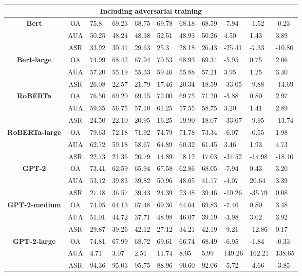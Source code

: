 \documentclass{article}
\begin{document}
\begin{table}[ht]
\begin{tabular}{c|c|p{0.6cm}p{0.6cm}p{0.6cm}|p{1cm}p{1cm}p{1cm}|p{1cm}p{1cm}p{1cm}}
\multicolumn{11}{c}{\textbf{Including adversarial training}} \\ \hline
\multirow{3}{*}{\textbf{Bert}} & OA   & 75.8  & 69.23 & 68.75 & 69.78 & 68.18 & 68.59 & -7.94 & -1.52 & -0.23 \\ 
& AUA  & 50.25 & 48.24 & 48.38 & 52.51 & 48.93 & 50.26 & 4.50 & 1.43 & 3.89  \\ 
& ASR  & 33.92 & 30.41 & 29.63 & 25.3  & 28.18 & 26.43 & -25.41 & -7.33 & -10.80 \\ \hline
\multirow{3}{*}{\textbf{Bert-large}} & OA   & 74.99  & 68.42 & 67.94 & 70.53 & 68.93 & 69.34 & -5.95 & 0.75 & 2.06 \\ 
& AUA  & 57.20  & 55.19  & 55.33  & 59.46 & 55.88 & 57.21  & 3.95 & 1.25 & 3.40 \\ 
& ASR  & 26.08 & 22.57 & 21.79 & 17.46 & 20.34 & 18.59 & -33.05 & -9.88 & -14.69 \\ \hline
\multirow{3}{*}{\textbf{RoBERTa}} & OA & 76.50 & 69.20 & 69.15 & 72.00 & 69.75 & 71.20 & -5.88 & 0.80 & 2.97 \\ 
& AUA & 59.35 & 56.75 & 57.10 & 61.25 & 57.55 & 58.75 & 3.20 & 1.41 & 2.89 \\ 
& ASR & 24.50 & 22.10 & 20.95 & 16.25 & 19.90 & 18.07 & -33.67 & -9.95 & -13.74 \\ \hline
\multirow{3}{*}{\textbf{RoBERTa-large}} & OA & 79.63 & 72.18 & 71.92 & 74.79 & 71.78 & 73.34 & -6.07 & -0.55 & 1.98 \\ 
& AUA & 62.72 & 59.18 & 58.67 & 64.89 & 60.32 & 61.45 & 3.46 & 1.93 & 4.73 \\ 
& ASR & 22.73 & 21.36 & 20.79 & 14.89 & 18.12 & 17.03 & -34.52 & -14.98 & -18.10 \\ \hline
\multirow{3}{*}{\textbf{GPT-2}}        & OA   & 73.41 & 62.59 & 65.94 & 67.58 & 62.86 & 68.05 & -7.94 & 0.43  & 3.20 \\ 
& AUA  & 53.12 & 39.83 & 39.82 & 50.96 & 48.05 & 41.17 & -4.07 & 20.64 & 3.39 \\ 
& ASR  & 27.18 & 36.57 & 39.43 & 24.39 & 23.48 & 39.46 & -10.26 & -35.79 & 0.08 \\ \hline
\multirow{3}{*}{\textbf{GPT-2-medium}}        & OA   & 74.95  & 64.13 & 67.48 & 69.36 & 64.64 & 69.83 & -7.46 & 0.80  & 3.48 \\ 
& AUA  & 51.01  & 44.72 & 37.71 & 48.98 & 46.07 & 39.19 & -3.98 & 3.02  & 3.92 \\ 
& ASR  & 29.87  & 39.26 & 42.12 & 27.12 & 34.21 & 42.19 & -9.21 & -12.86 & 0.17 \\ \hline
\multirow{3}{*}{\textbf{GPT-2-large}}        & OA   & 74.81  & 67.99 & 68.72 & 69.61 & 66.74 & 68.49 & -6.95 & -1.84 & -0.33 \\ 
& AUA  & 4.71   & 3.07  & 2.51  & 11.74 & 8.05  & 5.99  & 149.26 & 162.21 & 138.65 \\ 
& ASR  & 94.36  & 95.03 & 95.75 & 88.96 & 90.60 & 92.06 & -5.72  & -4.66  & -3.85 \\ \hline
\end{tabular}
\label{table:adversarial_combined_impact_a2t}
\end{table}
\end{document}
